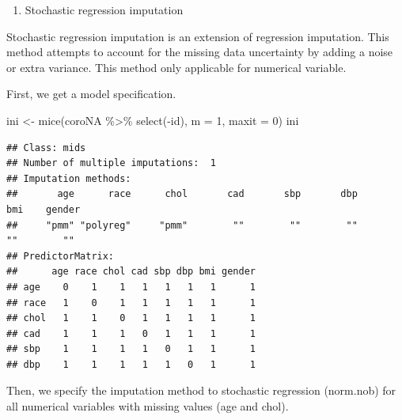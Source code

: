 \documentclass[
  10pt,
]{krantz}
\newenvironment{Shaded}{\begin{snugshade}}{\end{snugshade}}
\newcommand{\AttributeTok}[1]{\textcolor[rgb]{0.77,0.63,0.00}{#1}}
\newcommand{\DecValTok}[1]{\textcolor[rgb]{0.00,0.00,0.81}{#1}}
\newcommand{\FunctionTok}[1]{\textcolor[rgb]{0.00,0.00,0.00}{#1}}
\newcommand{\NormalTok}[1]{#1}
\newcommand{\OtherTok}[1]{\textcolor[rgb]{0.56,0.35,0.01}{#1}}
\newcommand{\SpecialCharTok}[1]{\textcolor[rgb]{0.00,0.00,0.00}{#1}}
\newcommand{\StringTok}[1]{\textcolor[rgb]{0.31,0.60,0.02}{#1}}
\providecommand{\tightlist}{%
  \setlength{\itemsep}{0pt}\setlength{\parskip}{0pt}}
\begin{document}
\begin{enumerate}
\def\labelenumi{\arabic{enumi}.}
\setcounter{enumi}{1}
\tightlist
\item
  Stochastic regression imputation
\end{enumerate}

Stochastic regression imputation is an extension of regression imputation. This method attempts to account for the missing data uncertainty by adding a noise or extra variance. This method only applicable for numerical variable.

First, we get a model specification.

\begin{Shaded}
\begin{Highlighting}[]
\NormalTok{ini }\OtherTok{\textless{}{-}} \FunctionTok{mice}\NormalTok{(coroNA }\SpecialCharTok{\%\textgreater{}\%} \FunctionTok{select}\NormalTok{(}\SpecialCharTok{{-}}\NormalTok{id), }\AttributeTok{m =} \DecValTok{1}\NormalTok{, }\AttributeTok{maxit =} \DecValTok{0}\NormalTok{) }
\NormalTok{ini}
\end{Highlighting}
\end{Shaded}

\begin{verbatim}
## Class: mids
## Number of multiple imputations:  1 
## Imputation methods:
##       age      race      chol       cad       sbp       dbp       bmi    gender 
##     "pmm" "polyreg"     "pmm"        ""        ""        ""        ""        "" 
## PredictorMatrix:
##      age race chol cad sbp dbp bmi gender
## age    0    1    1   1   1   1   1      1
## race   1    0    1   1   1   1   1      1
## chol   1    1    0   1   1   1   1      1
## cad    1    1    1   0   1   1   1      1
## sbp    1    1    1   1   0   1   1      1
## dbp    1    1    1   1   1   0   1      1
\end{verbatim}

Then, we specify the imputation method to stochastic regression (norm.nob) for all numerical variables with missing values (age and chol).

\begin{Shaded}
\end{Shaded}
\end{document}
